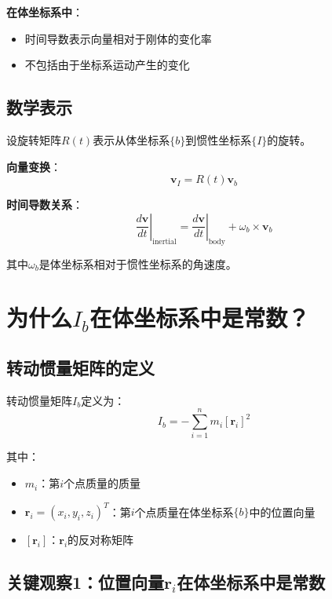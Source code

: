 \documentclass[12pt,a4paper]{article}
\begin{document}
\textbf{在体坐标系中}：
\begin{itemize}
\item 时间导数表示向量相对于刚体的变化率
\item 不包括由于坐标系运动产生的变化
\end{itemize}

\subsection{数学表示}

设旋转矩阵$R(t)$表示从体坐标系$\{b\}$到惯性坐标系$\{I\}$的旋转。

\textbf{向量变换}：
\begin{equation}
\bm{v}_I = R(t) \bm{v}_b
\end{equation}

\textbf{时间导数关系}：
\begin{equation}
\left.\frac{d\bm{v}}{dt}\right|_{\text{inertial}} = \left.\frac{d\bm{v}}{dt}\right|_{\text{body}} + \omega_b \times \bm{v}_b
\end{equation}

其中$\omega_b$是体坐标系相对于惯性坐标系的角速度。

\section{为什么$I_b$在体坐标系中是常数？}

\subsection{转动惯量矩阵的定义}

转动惯量矩阵$I_b$定义为：
\begin{equation}
I_b = -\sum_{i=1}^{n} m_i [\bm{r}_i]^2
\label{eq:inertia_definition}
\end{equation}

其中：
\begin{itemize}
\item $m_i$：第$i$个点质量的质量
\item $\bm{r}_i = (x_i, y_i, z_i)^T$：第$i$个点质量在体坐标系$\{b\}$中的位置向量
\item $[\bm{r}_i]$：$\bm{r}_i$的反对称矩阵
\end{itemize}

\subsection{关键观察1：位置向量$\bm{r}_i$在体坐标系中是常数}
\end{document}

